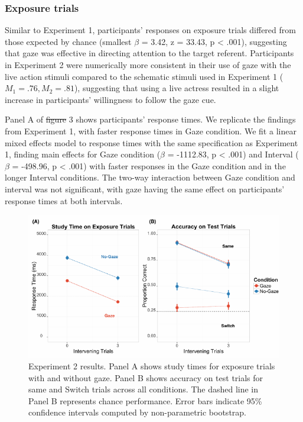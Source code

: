\documentclass[authoryear, review]{elsarticle}
\newenvironment{CodeChunk}{}{}
\providecommand{\DIFaddtex}[1]{{\protect\color{blue}\uwave{#1}}} %
\providecommand{\DIFdeltex}[1]{{\protect\color{red}\sout{#1}}}                      %
\providecommand{\DIFaddbegin}{} %
\providecommand{\DIFaddend}{} %
\providecommand{\DIFdelbegin}{} %
\providecommand{\DIFdelend}{} %
\providecommand{\DIFadd}[1]{\texorpdfstring{\DIFaddtex{#1}}{#1}} %
\providecommand{\DIFdel}[1]{\texorpdfstring{\DIFdeltex{#1}}{}} %
\begin{document}
\subsubsection{Exposure trials}\label{exposure-trials-1}

Similar to Experiment 1, participants' responses on exposure trials
differed from those expected by chance (smallest \(\beta\) = 3.42, z =
33.43, p \textless{} .001), suggesting that gaze was effective in
directing attention to the target referent. Participants in Experiment 2
were numerically more consistent in their use of gaze with the live
action stimuli compared to the schematic stimuli used in Experiment 1
(\(M_1 = .76, M_2 = .81\)), suggesting that using a live actress
resulted in a slight increase in participants' willingness to follow the
gaze cue.

Panel A of \DIFdelbegin \DIFdel{figure }\DIFdelend \DIFaddbegin \DIFadd{Figure }\DIFaddend 3 shows participants' response times. We replicate the
findings from Experiment 1, with faster response times in Gaze
condition. We fit a linear mixed effects model to response times with
the same specification as Experiment 1, finding main effects for Gaze
condition (\(\beta\) = -1112.83, p \textless{} .001) and Interval
(\(\beta\) = -498.96, p \textless{} .001) with faster responses in the
Gaze condition and in the longer Interval conditions. The two-way
interaction between Gaze condition and interval was not significant,
with gaze having the same effect on participants' response times at both
intervals.

\begin{CodeChunk}
\begin{figure}[tb]
\includegraphics{figs/expt2-plot-1} \caption[Experiment 2 results]{Experiment 2 results. Panel A shows study times for exposure trials with and without gaze. Panel B shows accuracy on test trials for same and Switch trials across all conditions. The dashed line in Panel B represents chance performance. Error bars indicate 95\% confidence intervals computed by non-parametric bootstrap.}\label{fig:expt2-plot}
\end{figure}
\end{CodeChunk}
\end{document}
